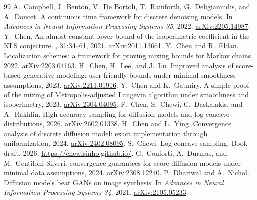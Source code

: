 \documentclass[10pt,a4paper]{amsart}
\numberwithin{equation}{section}
\begin{document}
\begin{thebibliography}{99}
 A.~Campbell, J.~Benton, V.~De Bortoli, T.~Rainforth, G.~Deligiannidis, and A.~Doucet. \newblock A continuous time framework for discrete denoising models. \newblock In {\em Advances in Neural Information Processing Systems 35}, 2022. \newblock \href{https://arxiv.org/abs/2205.14987}{arXiv:2205.14987}.
 Y.~Chen. \newblock An almost constant lower bound of the isoperimetric coefficient in the {KLS} conjecture. , 31:34--61, 2021. \newblock \href{https://arxiv.org/abs/2011.13661}{arXiv:2011.13661}.
 Y.~Chen and R.~Eldan. \newblock Localization schemes: a framework for proving mixing bounds for {Markov} chains, 2022. \newblock \href{https://arxiv.org/abs/2203.04163}{arXiv:2203.04163}.
 H.~Chen, H.~Lee, and J.~Lu. \newblock Improved analysis of score-based generative modeling: user-friendly bounds under minimal smoothness assumptions, 2023. \newblock \href{https://arxiv.org/abs/2211.01916}{arXiv:2211.01916}.
 Y.~Chen and K.~Gatmiry. \newblock A simple proof of the mixing of {Metropolis}-adjusted {Langevin} algorithm under smoothness and isoperimetry, 2023. \newblock \href{https://arxiv.org/abs/2304.04095}{arXiv:2304.04095}.
 F.~Chen, S.~Chewi, C.~Daskalakis, and A.~Rakhlin. \newblock High-accuracy sampling for diffusion models and log-concave distributions, 2026. \newblock \href{https://arxiv.org/abs/2602.01338}{arXiv:2602.01338}.
 H.~Chen and L.~Ying. \newblock Convergence analysis of discrete diffusion model: exact implementation through uniformization, 2024. \newblock \href{https://arxiv.org/abs/2402.08095}{arXiv:2402.08095}.
 S.~Chewi. \newblock Log-concave sampling. \newblock Book draft, 2026. \newblock \url{https://chewisinho.github.io/}.
 G.~Conforti, A.~Durmus, and M.~Gentiloni Silveri.  convergence guarantees for score diffusion models under minimal data assumptions, 2024. \newblock \href{https://arxiv.org/abs/2308.12240}{arXiv:2308.12240}.
 P.~Dhariwal and A.~Nichol. \newblock Diffusion models beat {GANs} on image synthesis. \newblock In {\em Advances in Neural Information Processing Systems 34}, 2021. \newblock \href{https://arxiv.org/abs/2105.05233}{arXiv:2105.05233}.

\end{thebibliography}
\end{document}
